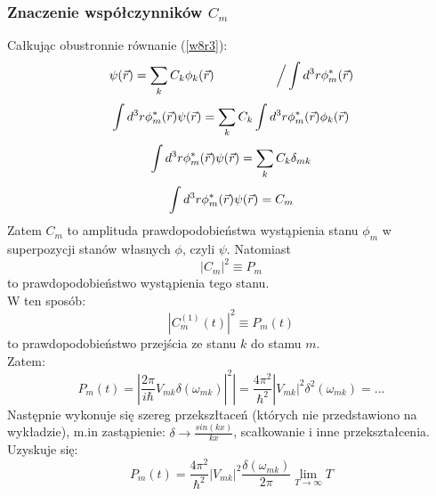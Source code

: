 \subsubsection{Znaczenie współczynników $C_m$}
Całkując obustronnie równanie (\ref{w8r3}):
\begin{equation}\psi(\vec{r})=\sum_k C_k\phi_k(\vec{r}) ~~~~~~~~~~~~~~~\Big/\int d^3r\phi_m^*(\vec{r})\nonumber
\end{equation}
\begin{equation}\int d^3r\phi_m^*(\vec{r})\psi(\vec{r})=\sum_k C_k\int d^3r\phi_m^*(\vec{r})\phi_k(\vec{r})
\end{equation}
\begin{equation}\int d^3r\phi_m^*(\vec{r})\psi(\vec{r})=\sum_k C_k\delta_{mk}
\end{equation}
\begin{equation}\int d^3r\phi_m^*(\vec{r})\psi(\vec{r})=C_m\end{equation}
Zatem $C_m$ to amplituda prawdopodobieństwa wystąpienia stanu $\phi_m$ w superpozycji stanów własnych $\phi$, czyli $\psi$. Natomiast
\begin{equation}|C_m|^2\equiv P_m\end{equation}
to prawdopodobieństwo wystąpienia tego stanu.\\
W ten sposób:
\begin{equation}|C_m^{(1)}(t)|^2\equiv P_m(t)\end{equation}
to prawdopodobieństwo przejścia ze stanu $k$ do stamu $m$.\\
Zatem:
\begin{equation}P_m(t)=|\frac{2\pi}{i\hbar}V_{mk}\delta(\omega_{mk})|^2|=
\frac{4\pi^2}{\hbar^2}|V_{mk}|^2\delta^2(\omega_{mk})=...
\end{equation}
Następnie wykonuje się szereg przekszłtaceń (których nie przedstawiono na wykładzie), m.in zastąpienie: $\delta\rightarrow \frac{sin(kx)}{kx}$, scałkowanie i inne przekształcenia. Uzyskuje się:
\begin{equation}
P_m(t)=\frac{4\pi^2}{\hbar^2}|V_{mk}|^2\frac{\delta(\omega_{mk})}{2\pi}\lim_{T\rightarrow \infty} T
\end{equation}
